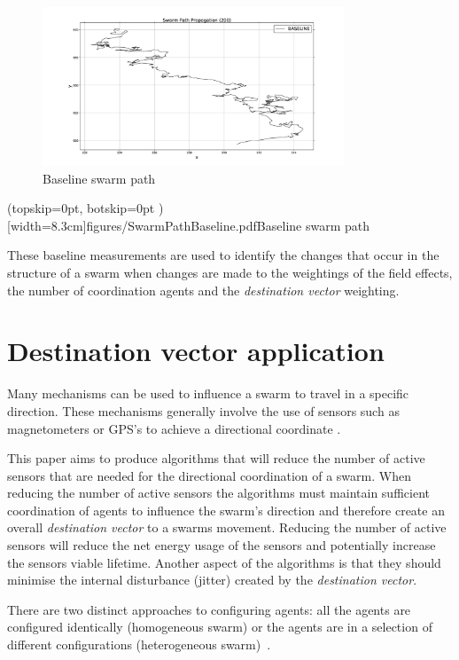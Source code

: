 \documentclass{ieeeaccess}
\begin{document}
\begin{figure}
\begin{center}
\includegraphics[width=9cm]{figures/SwarmPathBaseline.pdf}
\end{center}
\caption{Baseline swarm path\label{coord:SwarmPathBaseline1}}
\end{figure}

\Figure[t!](topskip=0pt, botskip=0pt )[width=8.3cm]{figures/SwarmPathBaseline.pdf}{Baseline swarm path\label{coord:SwarmPathBaseline1}}

These baseline measurements are used to identify the changes that occur in the structure of a swarm when changes are made to the weightings of the field effects, the number of coordination agents and the \textit{destination vector} weighting.

\section{Destination vector application}
Many mechanisms can be used to influence a swarm to travel in a specific direction. These mechanisms generally involve the use of sensors such as magnetometers or GPS's to achieve a directional coordinate \cite{SG:15,TG:12}. 

This paper aims to produce algorithms that will reduce the number of active sensors that are needed for the directional coordination of a swarm. When reducing the number of active sensors the algorithms must maintain sufficient coordination of agents to influence the swarm's direction and therefore create an overall \textit{destination vector} to a swarms movement. Reducing the number of active sensors will reduce the net energy usage of the sensors and potentially increase the sensors viable lifetime. Another aspect of the algorithms is that they should minimise the internal disturbance (jitter) created by the \textit{destination vector}.

There are two distinct approaches to configuring agents: all the agents are configured identically (homogeneous swarm) or the agents are in a selection of different configurations (heterogeneous swarm)~\cite{BS:13}. 
\end{document}
